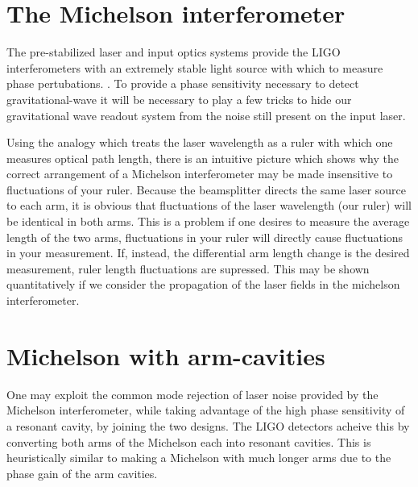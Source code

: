 \section{The Michelson interferometer}
The pre-stabilized laser and input optics systems provide the LIGO interferometers with an extremely stable light source with which to measure phase pertubations. %
. %
To provide a phase sensitivity necessary to detect gravitational-wave it will be necessary to play a few tricks to hide our gravitational wave readout system from the noise still present on the input laser.

Using the analogy which treats the laser wavelength as a ruler with which one measures optical path length, there is an intuitive picture which shows why the correct arrangement of a Michelson interferometer may be made insensitive to fluctuations of your ruler. %
Because the beamsplitter directs the same laser source to each arm, it is obvious that fluctuations of the laser wavelength (our ruler) will be identical in both arms. %
This is a problem if one desires to measure the average length of the two arms, fluctuations in your ruler will directly cause fluctuations in your measurement. %
If, instead, the differential arm length change is the desired measurement, ruler length fluctuations are supressed. %
This may be shown quantitatively if we consider the propagation of the laser fields in the michelson interferometer.



\section{Michelson with arm-cavities}
One may exploit the common mode rejection of laser noise provided by the Michelson interferometer, while taking advantage of the high phase sensitivity of a resonant cavity, by joining the two designs. %
The LIGO detectors acheive this by converting both arms of the Michelson each into resonant cavities. %
This is heuristically similar to making a Michelson with much longer arms due to the phase gain of the arm cavities.

